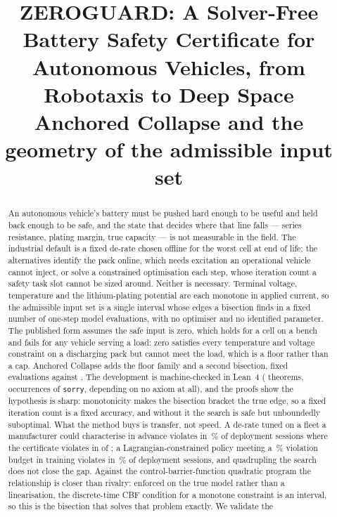 \documentclass[11pt,letterpaper]{article}
\title{\vspace{-1.4cm}\large\textbf{ZEROGUARD: A Solver-Free Battery Safety Certificate for\\[2pt]
Autonomous Vehicles, from Robotaxis to Deep Space}\\[5pt]
\normalsize\normalfont Anchored Collapse and the geometry of the admissible input set}
\author{}
\date{}
\theoremstyle{definition}
\theoremstyle{remark}
\begin{document}
\maketitle
\vspace{-1.4cm}

\begin{abstract}
An autonomous vehicle's battery must be pushed hard enough to be useful and held back enough to be
safe, and the state that decides where that line falls --- series resistance, plating margin, true
capacity --- is not measurable in the field. The industrial default is a fixed de-rate chosen offline
for the worst cell at end of life; the alternatives identify the pack online, which needs
excitation an operational vehicle cannot inject, or solve a constrained optimisation each step,
whose iteration count a safety task slot cannot be sized around. Neither is necessary. Terminal voltage, temperature and the lithium-plating potential are each
monotone in applied current, so the admissible input set is a single interval whose edges a bisection
finds in a fixed number of one-step model evaluations, with no optimiser and no identified parameter.
The published form assumes the safe input is zero, which holds for a cell on a bench and fails for any
vehicle serving a load: zero satisfies every temperature and voltage constraint on a discharging pack
but cannot meet the load, which is a floor rather than a cap. Anchored Collapse adds the floor family
and a second bisection, \evalDischarge{} fixed evaluations against \evalCharge. The development is
machine-checked in Lean~4 (\leanThms{} theorems, \leanSorry{} occurrences of \texttt{sorry},
\leanFreeWord{} depending on no axiom at all), and the proofs show the hypothesis is sharp:
monotonicity makes the bisection bracket the true edge, so a fixed iteration count is a fixed
accuracy, and without it the search is safe but unboundedly suboptimal. What the method buys is transfer, not
speed. A de-rate tuned on a fleet a manufacturer could characterise in advance violates in
\bThreeTunedViolPct\,\% of deployment sessions where the certificate violates in \bThreeZgViol{} of
\bThreeTrials; a Lagrangian-constrained policy meeting a \rlHardTrain\,\% violation budget in training
violates in \rlHardDeploy\,\% of deployment sessions, and quadrupling the search does not close the
gap. Against the control-barrier-function quadratic program the relationship is closer than rivalry:
enforced on the true model rather than a linearisation, the discrete-time CBF condition for a monotone
constraint is an interval, so this is the bisection that solves that problem exactly. We validate the

\end{abstract}
\end{document}
